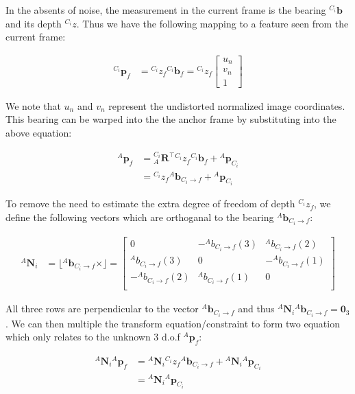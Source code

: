 In the absents of noise, the measurement in the current frame is the bearing ${}^{C_i}\mathbf{b}$ and its depth ${}^{C_i}z$. Thus we have the following mapping to a feature seen from the current frame\+:

\begin{align*} {}^{C_i}\mathbf{p}_f & = {}^{C_i}z_{f} {}^{C_i}\mathbf{b}_{f} = {}^{C_i}z_{f} \begin{bmatrix} u_n \\ v_n \\ 1 \end{bmatrix} \end{align*}

We note that $u_n$ and $v_n$ represent the undistorted normalized image coordinates. This bearing can be warped into the the anchor frame by substituting into the above equation\+:

\begin{align*} {}^A\mathbf{p}_f & = {}^{C_i}_A\mathbf{R}^\top {}^{C_i}z_{f} {}^{C_i}\mathbf{b}_{f} + {}^A\mathbf{p}_{C_i} \\ & = {}^{C_i}z_{f} {}^{A}\mathbf{b}_{C_i \rightarrow f} + {}^A\mathbf{p}_{C_i} \end{align*}

To remove the need to estimate the extra degree of freedom of depth ${}^{C_i}z_{f}$, we define the following vectors which are orthoganal to the bearing ${}^{A}\mathbf{b}_{C_i \rightarrow f}$\+:

\begin{align*} {}^{A}\mathbf{N}_i &= \lfloor {}^{A}\mathbf{b}_{C_i \rightarrow f} \times\rfloor = \begin{bmatrix} 0 & -{}^{A}{b}_{C_i \rightarrow f}(3) & {}^{A}{b}_{C_i \rightarrow f}(2) \\ {}^{A}{b}_{C_i \rightarrow f}(3) & 0 & -{}^{A}{b}_{C_i \rightarrow f}(1) \\ -{}^{A}{b}_{C_i \rightarrow f}(2) & {}^{A}{b}_{C_i \rightarrow f}(1) & 0 \\ \end{bmatrix} \end{align*}

All three rows are perpendicular to the vector ${}^{A}\mathbf{b}_{C_i \rightarrow f}$ and thus ${}^{A}\mathbf{N}_i{}^{A}\mathbf{b}_{C_i \rightarrow f}=\mathbf{0}_3$. We can then multiple the transform equation/constraint to form two equation which only relates to the unknown 3 d.\+o.\+f ${}^A\mathbf{p}_f$\+:

\begin{align*} {}^{A}\mathbf{N}_i {}^A\mathbf{p}_f & = {}^{A}\mathbf{N}_i {}^{C_i}z_{f} {}^{A}\mathbf{b}_{C_i \rightarrow f} + {}^{A}\mathbf{N}_i {}^A\mathbf{p}_{C_i} \\ & = {}^{A}\mathbf{N}_i {}^A\mathbf{p}_{C_i} \end{align*}

